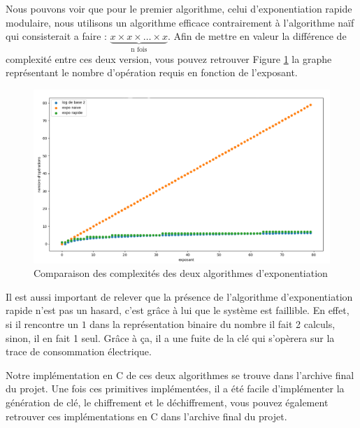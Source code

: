 Nous pouvons voir que pour le premier algorithme, celui d'exponentiation rapide modulaire, nous utilisons un algorithme efficace contrairement à l'algorithme naïf qui consisterait a faire : $\underbrace{x \times x \times \ldots \times x}_{\text{n fois}}$. Afin de mettre en valeur la différence de complexité entre ces deux version, vous pouvez retrouver Figure \ref{fig:diff_complexite} la graphe représentant le nombre d'opération requis en fonction de l'exposant.
\begin{figure}[H]
    \centering
    \includegraphics[width=\textwidth]{fig/diff_complexite.png}
    \caption{Comparaison des complexités des deux algorithmes d'exponentiation}
    \label{fig:diff_complexite}
\end{figure}
Il est aussi important de relever que la présence de l'algorithme d’exponentiation rapide n'est pas un hasard, c'est grâce à lui que le système est faillible. En effet, si il rencontre un $1$ dans la représentation binaire du nombre il fait 2 calculs, sinon, il en fait 1 seul. Grâce à ça, il a une fuite de la clé qui s’opèrera sur la trace de consommation électrique.

Notre implémentation en C de ces deux algorithmes se trouve dans l'archive final du projet. Une fois ces primitives implémentées, il a été facile d'implémenter la génération de clé, le chiffrement et le déchiffrement, vous pouvez également retrouver ces implémentations en C dans l'archive final du projet.

